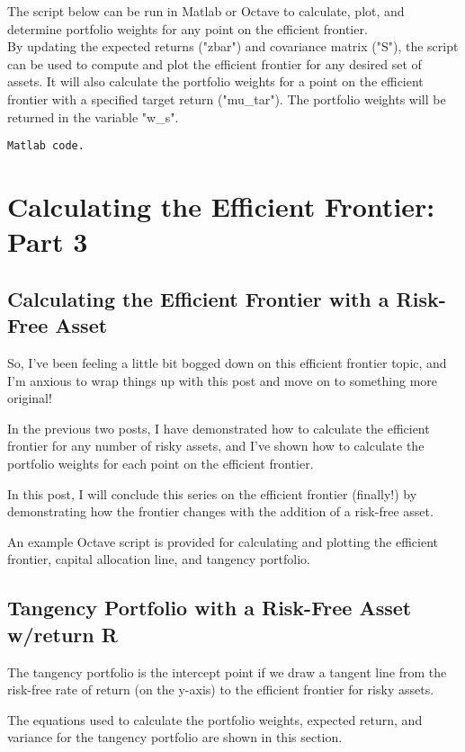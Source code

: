 \documentclass[12pt,a4paper]{article}
\begin{document}
The script below can be run in Matlab or Octave to calculate, plot, and determine portfolio weights for any point on the efficient frontier.\\
By updating the expected returns ("zbar") and covariance matrix ("S"), the script can be used to compute and plot the efficient frontier for any desired set of assets.  It will also calculate the portfolio weights for a point on the efficient frontier with a specified target return ("mu\_tar").  The portfolio weights will be returned in the variable "w\_s".

\lstset{language=Matlab}
\begin{lstlisting}[frame=single]
Matlab code.
\end{lstlisting}

\section{Calculating the Efficient Frontier: Part 3}
\subsection{Calculating the Efficient Frontier with a Risk-Free Asset}
So, I’ve been feeling a little bit bogged down on this efficient frontier topic, and I’m anxious to wrap things up with this post and move on to something more original!

In the previous two posts, I have demonstrated how to calculate the efficient frontier for any number of risky assets, and I’ve shown how to calculate the portfolio weights for each point on the efficient frontier.

In this post, I will conclude this series on the efficient frontier (finally!) by demonstrating how the frontier changes with the addition of a risk-free asset.

An example Octave script is provided for calculating and plotting the efficient frontier, capital allocation line, and tangency portfolio.

\subsection{Tangency Portfolio with a Risk-Free Asset w/return R}
The tangency portfolio is the intercept point if we draw a tangent line from the risk-free rate of return (on the y-axis) to the efficient frontier for risky assets. 

The equations used to calculate the portfolio weights, expected return, and variance for the tangency portfolio are shown in this section.
\end{document}
